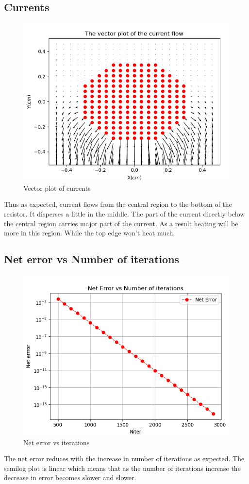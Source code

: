 \documentclass[11pt, a4paper]{article}
\begin{document}
    \subsection{Currents}
    \begin{figure}[!h]
        \centering
        \includegraphics[scale = 0.8]{Figure6.png}
        \caption{Vector plot of currents}
        \label{fig:Figure 6}
    \end{figure}
    Thus as expected, current flows from the central region to the bottom of the resistor. It disperses a little in the middle. The part of the current directly below the central region carries major part of the current. As a result heating will be more in this region. While the top edge won't heat much.
    \subsection{Net error vs Number of iterations}
    \begin{figure}[!h]
        \centering
        \includegraphics[scale = 0.8]{Figure7.png}
        \caption{Net error vs iterations}
        \label{fig:Figure 7}
    \end{figure}
    The net error reduces with the increase in number of iterations as expected. The semilog plot is linear which means that as the number of iterations increase the decrease in error becomes slower and slower.
\end{document}
